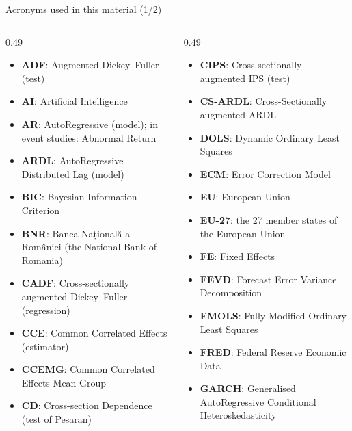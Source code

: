 {
\begin{frame}[noframenumbering]
    \titlepage
\end{frame}
}
\begin{frame}{Acronyms used in this material (1/2)}
\begin{columns}[T]
\begin{column}{0.49\textwidth}
\begin{itemize}\setlength{\itemsep}{0pt}
    \item \textbf{ADF}: Augmented Dickey–Fuller (test)
    \item \textbf{AI}: Artificial Intelligence
    \item \textbf{AR}: AutoRegressive (model); in event studies: Abnormal Return
    \item \textbf{ARDL}: AutoRegressive Distributed Lag (model)
    \item \textbf{BIC}: Bayesian Information Criterion
    \item \textbf{BNR}: Banca Națională a României (the National Bank of Romania)
    \item \textbf{CADF}: Cross-sectionally augmented Dickey–Fuller (regression)
    \item \textbf{CCE}: Common Correlated Effects (estimator)
    \item \textbf{CCEMG}: Common Correlated Effects Mean Group
    \item \textbf{CD}: Cross-section Dependence (test of Pesaran)
\end{itemize}
\end{column}
\begin{column}{0.49\textwidth}
\begin{itemize}\setlength{\itemsep}{0pt}
    \item \textbf{CIPS}: Cross-sectionally augmented IPS (test)
    \item \textbf{CS-ARDL}: Cross-Sectionally augmented ARDL
    \item \textbf{DOLS}: Dynamic Ordinary Least Squares
    \item \textbf{ECM}: Error Correction Model
    \item \textbf{EU}: European Union
    \item \textbf{EU-27}: the 27 member states of the European Union
    \item \textbf{FE}: Fixed Effects
    \item \textbf{FEVD}: Forecast Error Variance Decomposition
    \item \textbf{FMOLS}: Fully Modified Ordinary Least Squares
    \item \textbf{FRED}: Federal Reserve Economic Data
    \item \textbf{GARCH}: Generalised AutoRegressive Conditional Heteroskedasticity
\end{itemize}
\end{column}
\end{columns}
\end{frame}

